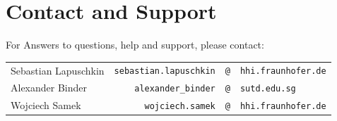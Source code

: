 \documentclass[a4wide]{article}
\begin{document}
\section{Contact and Support}
\label{sec:contact}

For Answers to questions, help and support, please contact:\\
\begin{tabular}{lrcl}
Sebastian Lapuschkin  & \texttt{sebastian.lapuschkin} & \hspace{-5mm} \texttt{@} & \hspace{-5mm} \texttt{hhi.fraunhofer.de}\\
Alexander Binder  & \texttt{alexander\_binder} & \hspace{-5mm} \texttt{@} & \hspace{-5mm} \texttt{sutd.edu.sg}\\
Wojciech Samek  & \texttt{wojciech.samek} & \hspace{-5mm} \texttt{@} & \hspace{-5mm} \texttt{hhi.fraunhofer.de}
\end{tabular}




\end{document}
